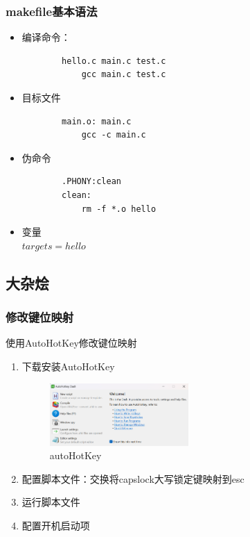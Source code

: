 \documentclass[a4paper,12pt]{article}
\begin{document}
\subsubsection{\color{green}makefile基本语法}
\begin{itemize}
    \item 编译命令：
    \begin{verbatim}
        hello.c main.c test.c
            gcc main.c test.c
    \end{verbatim}
    \item 目标文件
    \begin{verbatim}
        main.o: main.c
            gcc -c main.c
    \end{verbatim}
    \item 伪命令
    \begin{verbatim}
        .PHONY:clean
        clean:
            rm -f *.o hello
    \end{verbatim}
    \item 变量\\ $targets = hello $
\end{itemize}

\subsection{\color{red}大杂烩}
\subsubsection{\color{green}修改键位映射}
使用AutoHotKey修改键位映射
\begin{enumerate}
    \item 下载安装AutoHotKey
    \begin{figure}[h]
        \centering
        \includegraphics[width=0.5\textwidth]{board.png}
        \caption{autoHotKey}
    \end{figure}
    \item 配置脚本文件：交换将capslock大写锁定键映射到esc
    \item 运行脚本文件
    \item 配置开机启动项
\end{enumerate}
\end{document}
